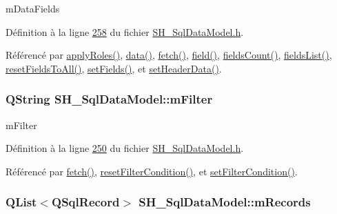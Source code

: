 m\-Data\-Fields 



Définition à la ligne \hyperlink{SH__SqlDataModel_8h_source_l00258}{258} du fichier \hyperlink{SH__SqlDataModel_8h_source}{S\-H\-\_\-\-Sql\-Data\-Model.\-h}.



Référencé par \hyperlink{classSH__SqlDataModel_a2e529bea67d6b31d8eb4723a81a1b354}{apply\-Roles()}, \hyperlink{classSH__SqlDataModel_a30cc763618d73a1bb5410c84812c0b9f}{data()}, \hyperlink{classSH__SqlDataModel_a8d9b08d282a304945b9ee2f474020980}{fetch()}, \hyperlink{classSH__SqlDataModel_a442cdea9007cb61ed9d2fbdd01ddccbf}{field()}, \hyperlink{classSH__SqlDataModel_a0fd7bd5380ce0ba9a2ca84033093432d}{fields\-Count()}, \hyperlink{classSH__SqlDataModel_aaca5b8197cf2e6a10cdda5e19522ffec}{fields\-List()}, \hyperlink{classSH__SqlDataModel_a2ce01d331acbef46e8ae9d5963f3521d}{reset\-Fields\-To\-All()}, \hyperlink{classSH__SqlDataModel_a1a345d536e6e08a03cb333351ce677af}{set\-Fields()}, et \hyperlink{classSH__SqlDataModel_aa9ad9f29681bffdec372db4bba0aa82f}{set\-Header\-Data()}.

\hypertarget{classSH__SqlDataModel_af83c15ae3ad1dc4617dd58f2a852a1e2}{
\subsubsection[{m\-Filter}]{\setlength{\rightskip}{0pt plus 5cm}Q\-String S\-H\-\_\-\-Sql\-Data\-Model\-::m\-Filter\hspace{0.3cm}{\ttfamily [private]}}}\label{classSH__SqlDataModel_af83c15ae3ad1dc4617dd58f2a852a1e2}


m\-Filter 



Définition à la ligne \hyperlink{SH__SqlDataModel_8h_source_l00250}{250} du fichier \hyperlink{SH__SqlDataModel_8h_source}{S\-H\-\_\-\-Sql\-Data\-Model.\-h}.



Référencé par \hyperlink{classSH__SqlDataModel_a8d9b08d282a304945b9ee2f474020980}{fetch()}, \hyperlink{classSH__SqlDataModel_a365514bffdc835545c64b2d0a67849c9}{reset\-Filter\-Condition()}, et \hyperlink{classSH__SqlDataModel_a89f54fd7a3f4288367d45d3fc17d2821}{set\-Filter\-Condition()}.

\hypertarget{classSH__SqlDataModel_aa58096989daac3cd3fdea5e6dd4f27ee}{
\subsubsection[{m\-Records}]{\setlength{\rightskip}{0pt plus 5cm}Q\-List$<$Q\-Sql\-Record$>$ S\-H\-\_\-\-Sql\-Data\-Model\-::m\-Records\hspace{0.3cm}{\ttfamily [private]}}}\label{classSH__SqlDataModel_aa58096989daac3cd3fdea5e6dd4f27ee}


